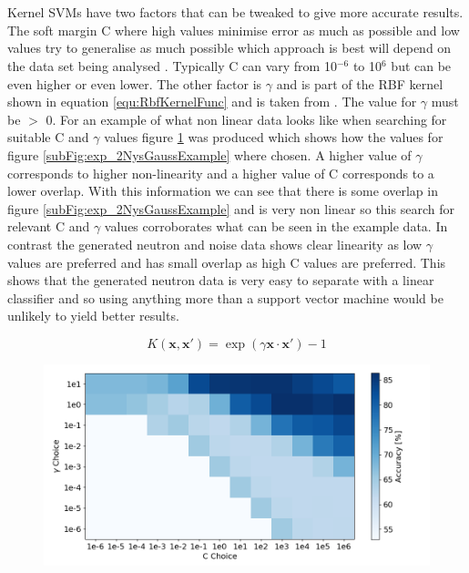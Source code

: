 \\\\Kernel SVMs have two factors that can be tweaked to give more accurate results. The soft margin C where high values minimise error as much as possible and low values try to generalise as much possible which approach is best will depend on the data set being analysed \cite{cortes1995support}. Typically C can vary from 10$^{-6}$ to 10$^6$ but can be even higher or even lower. The other factor is $\gamma$ and is part of the RBF kernel shown in equation \ref{equ:RbfKernelFunc} and is taken from \cite{Boser92atraining}. The value for $\gamma$ must be $>$ 0. For an example of what non linear data looks like when searching for suitable C and $\gamma$ values figure \ref{fig:GammaCGridSearchExp2Gauss} was produced which shows how the values for figure \ref{subFig:exp_2NysGaussExample} where chosen. A higher value of $\gamma$ corresponds to higher non-linearity and a higher value of C corresponds to a lower overlap. With this information we can see that there is some overlap in figure \ref{subFig:exp_2NysGaussExample} and is very non linear so this search for relevant C and $\gamma$ values corroborates what can be seen in the example data. In contrast the generated neutron and noise data shows clear linearity as low $\gamma$ values are preferred and has small overlap as high C values are preferred. This shows that the generated neutron data is very easy to separate with a linear classifier and so using anything more than a support vector machine would be unlikely to yield better results.

\begin{equation}
K(\mathbf{x,x'}) = \exp{(\gamma \mathbf{x \cdot x'})} - 1
\label{equ:RbfKernelFunc}
\end{equation}

\begin{figure}[htbp]
\centering
\includegraphics[width=0.9\linewidth]{Chapter4/Figs/Raster/GammaCGridSearchExp2Gauss.png}
\label{fig:GammaCGridSearchExp2Gauss}
\end{figure}


